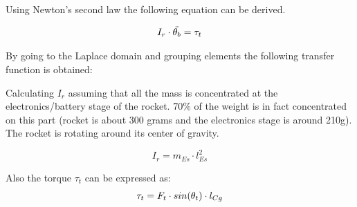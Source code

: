 		Using Newton's second law the following equation can be derived.

		\begin{equation}
			I_r \cdot \ddot{\theta_b}=\tau_t \addunit{\newton$\cdot$\meter} \label{eq:rocket_angle_1}
		\end{equation}
		\startexplain
		\stopexplain
		
%		
		
		By going to the Laplace domain and grouping elements the following transfer function is obtained:
%		
		
		Calculating $I_r$ assuming that all the mass is concentrated at the electronics/battery stage of the rocket. 70\% of the weight is in fact concentrated on this part (rocket is about 300 grams and the electronics stage is around 210g). The rocket is rotating around its center of gravity.
		
		\begin{equation}
		I_r=m_{Es} \cdot l_{Es}^2 \label{eq:rocket_angle_3}
		\end{equation}
		\startexplain
		\stopexplain
		
		Also the torque $\tau_t$ can be expressed as:
		\begin{equation}
		\tau_t = F_t \cdot sin(\theta_t) \cdot l_{Cg} \addunit{\newton$\cdot$\meter} \label{eq:tau_t}
		\end{equation}
		\startexplain
		\stopexplain
		
